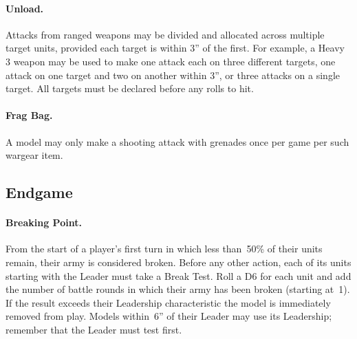 \paragraph{Unload.}  Attacks from ranged weapons may be divided and
allocated across multiple target units, provided each target is within
3'' of the first.  For example, a Heavy 3 weapon may be used to make
one attack each on three different targets, one attack on one target
and two on another within 3'', or three attacks on a single target.
All targets must be declared before any rolls to hit.

\paragraph{Frag Bag.} A model may only make a shooting attack with
grenades once per game per such wargear item.

\subsection{Endgame}


\paragraph{Breaking Point.}  From the start of a player's first turn
in which less than~50\% of their units remain, their army is
considered broken.  Before any other action, each of its units
starting with the Leader must take a Break Test.  Roll a D6 for each
unit and add the number of battle rounds in which their army has been
broken (starting at~1).  If the result exceeds their Leadership
characteristic the model is immediately removed from play.  Models
within~6'' of their Leader may use its Leadership; remember that the
Leader must test first.


